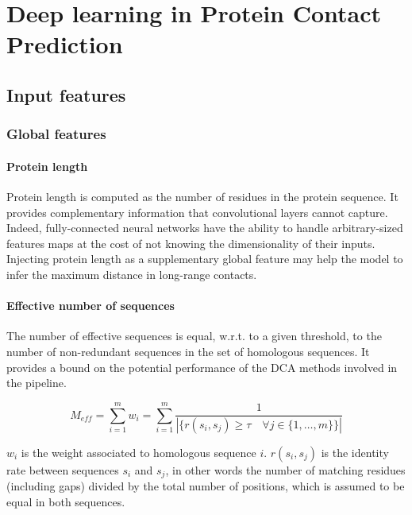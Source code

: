 \section{Deep learning in Protein Contact Prediction} \label{dlpredictors}

\subsection{Input features} \label{inputfeatures}

    \subsubsection{Global features}

        \paragraph{Protein length}

      	    Protein length is computed as the number of residues in the protein sequence.
    	    It provides complementary information that convolutional layers cannot capture.
     	    Indeed, fully-connected neural networks have the ability to handle arbitrary-sized
    	    features maps at the cost of not knowing the dimensionality of their inputs.
    	    Injecting protein length as a supplementary global feature may help the model
    	    to infer the maximum distance in long-range contacts.

	   \paragraph{Effective number of sequences} \label{meff}

    	    The number of effective sequences is equal, w.r.t. to a given threshold,
    	    to the number of non-redundant sequences in the set of homologous sequences.
    	    It provides a bound on the potential performance of the DCA methods involved
    	    in the pipeline.

            \begin{equation}
                M_{eff} = \sum_{i=1}^m w_i = \sum_{i=1}^m \frac{1}{|\{r(s_i, s_j) \ge \tau \quad \forall j \in \{1, \dotsc, m\}\}|}
            \end{equation}

            $w_i$ is the weight associated to homologous sequence $i$.
            $r(s_i, s_j)$ is the identity rate between sequences $s_i$ and $s_j$, in other words
            the number of matching residues (including gaps) divided by the total number of positions,
            which is assumed to be equal in both sequences.

